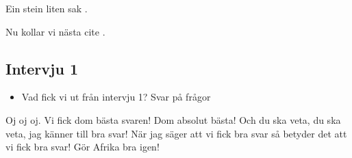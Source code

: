 Ein stein liten sak \cite{dne}.

Nu kollar vi nästa cite \cite{macgregor}.

%
%

\subsection{Intervju 1}
\begin{itemize}
    \item Vad fick vi ut från intervju 1? Svar på frågor
\end{itemize}
Oj oj oj.
Vi fick dom bästa svaren!
Dom absolut bästa!
Och du ska veta, du ska veta, jag känner till bra svar!
När jag säger att vi fick bra svar så betyder det att vi fick bra svar!
Gör Afrika bra igen!

%
%

